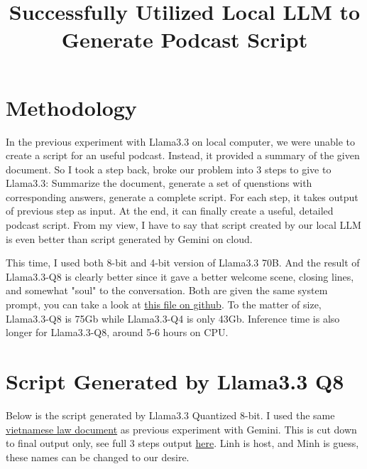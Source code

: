 \documentclass[12pt]{article}
\title{Successfully Utilized Local LLM to Generate Podcast Script}
\author{}
\date{}
\begin{document}
\maketitle
\section{Methodology}
In the previous experiment with Llama3.3 on local computer, we were unable to create a script for an useful podcast. Instead, it provided a summary of the given document. 
So I took a step back, broke our problem into 3 steps to give to Llama3.3: Summarize the document, generate a set of quenstions with corresponding answers, 
generate a complete script. For each step, it takes output of previous step as input. At the end, it can finally create a useful, detailed podcast script.
From my view, I have to say that script created by our local LLM is even better than script generated by Gemini on cloud. 

This time, I used both 8-bit and 4-bit version of Llama3.3 70B. And the result of Llama3.3-Q8 is clearly better since it gave a better welcome scene, closing lines, 
and somewhat "soul" to the conversation. Both are given the same system prompt, you can take a look at \href{https://github.com/Minhsuperfragile/llm_repurpose/blob/main/podcast_creation/default_prompts.py}{this file on github}.
To the matter of size, Llama3.3-Q8 is 75Gb while Llama3.3-Q4 is only 43Gb. Inference time is also longer for Llama3.3-Q8, around 5-6 hours on CPU.

\section{Script Generated by Llama3.3 Q8}
Below is the script generated by Llama3.3 Quantized 8-bit. I used the same \href{https://thuvienphapluat.vn/van-ban/Bo-may-hanh-chinh/Quyet-dinh-17-2021-QD-UBND-vi-tri-chuc-nang-Chi-cuc-Trong-trot-va-Bao-ve-thuc-vat-tinh-Lao-Cai-481420.aspx}{vietnamese law document} as previous experiment with Gemini.
This is cut down to final output only, see full 3 steps output \href{google.com}{here}. Linh is host, and Minh is guess, these names can be changed to our desire.
\end{document}
